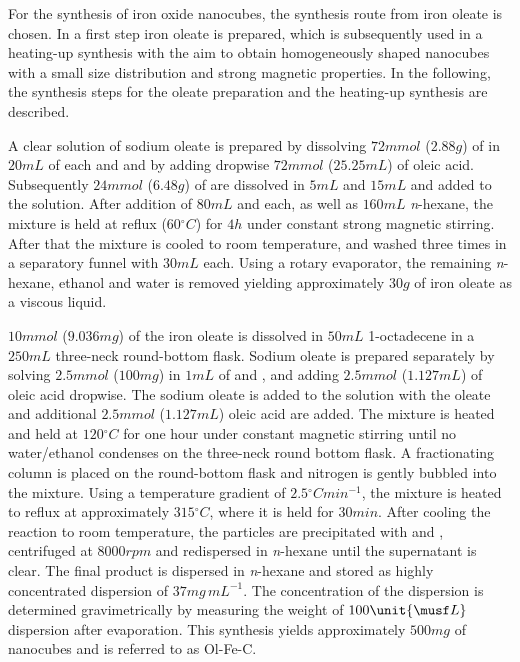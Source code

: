 \documentclass[\main/dresen_thesis.tex]{subfiles}
\begin{document}
  \label{sec:colloidalCrystals:nanoparticle:synthesisOleatesAcAc}
  For the synthesis of iron oxide nanocubes, the synthesis route from iron oleate is chosen.
  In a first step iron oleate is prepared, which is subsequently used in a heating-up synthesis with the aim to obtain homogeneously shaped nanocubes with a small size distribution and strong magnetic properties.
  In the following, the synthesis steps for the oleate preparation and the heating-up synthesis are described.

    A clear solution of sodium oleate is prepared by dissolving $72 \unit{mmol}$ ($2.88 \unit{g}$) of  in $20 \unit{mL}$ of each  and  and by adding dropwise $72 \unit{mmol}$ ($25.25 \unit{mL}$) of oleic acid.
    Subsequently $24 \unit{mmol}$ ($6.48 \unit{g}$) of  are dissolved in $5 \unit{mL}$  and $15 \unit{mL}$  and added to the solution.
    After addition of $80 \unit{mL}$  and  each, as well as $160 \unit{mL}$ \textit{n}-hexane, the mixture is held at reflux ($60 \unit{^\circ C}$) for $4 \unit{h}$ under constant strong magnetic stirring.
    After that the mixture is cooled to room temperature, and washed three times in a separatory funnel with $30 \unit{mL}$  each.
    Using a rotary evaporator, the remaining \textit{n}-hexane, ethanol and water is removed yielding approximately $30 \unit{g}$ of iron oleate as a viscous liquid.

    $10 \unit{mmol}$ ($9.036 \unit{mg}$) of the iron oleate is dissolved in $50 \unit{mL}$ 1-octadecene in a $250 \unit{mL}$ three-neck round-bottom flask.
    Sodium oleate is prepared separately by solving $2.5 \unit{mmol}$ ($100 \unit{mg}$)  in $1 \unit{mL}$ of  and , and adding $2.5 \unit{mmol}$ ($1.127 \unit{mL}$) of oleic acid dropwise.
    The sodium oleate is added to the solution with the oleate and additional $2.5 \unit{mmol}$ ($1.127 \unit{mL}$) oleic acid are added.
    The mixture is heated and held at $120 \unit{^\circ C}$ for one hour under constant magnetic stirring until no water/ethanol condenses on the three-neck round bottom flask.
    A fractionating column is placed on the round-bottom flask and nitrogen is gently bubbled into the mixture.
    Using a temperature gradient of $2.5 \unit{^\circ C min^{-1}}$, the mixture is heated to reflux at approximately $315 \unit{^\circ C}$, where it is held for $30 \unit{min}$.
    After cooling the reaction to room temperature, the particles are precipitated with  and , centrifuged at $8000 \unit{rpm}$ and redispersed in \textit{n}-hexane until the supernatant is clear.
    The final product is dispersed in \textit{n}-hexane and stored as highly concentrated dispersion of $37 \unit{mg \, mL^{-1}}$.
    The concentration of the dispersion is determined gravimetrically by measuring the weight of $100 \unit{\musf L}$ dispersion after evaporation.
    This synthesis yields approximately $500 \unit{mg}$ of nanocubes and is referred to as Ol-Fe-C.
  
\end{document}
